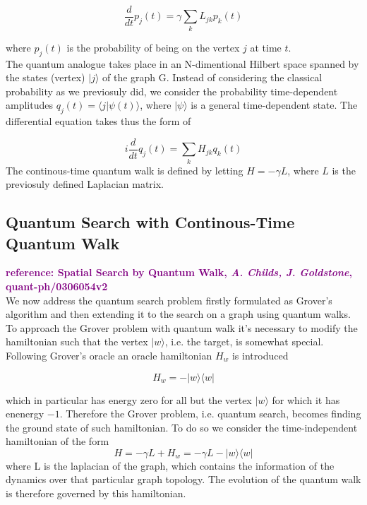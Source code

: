 \documentclass[aps,pra,reprint, onecolumn, showkeys]{revtex4-2}
\newcommand{\purple}[1]{\textcolor{purple}{\textbf{reference: #1}}}
\begin{document}
\begin{equation}
  \frac{d}{dt}p_j(t) = \gamma\sum_{k}L_{jk}p_k(t)
\end{equation}

where $p_j(t)$ is the probability of being on the vertex $j$ at time $t$.\\
The quantum analogue takes place in an N-dimentional Hilbert space spanned by the states (vertex) $|j\rangle$ of the graph G. Instead of considering the classical probability as we previosuly did, we consider the probability time-dependent amplitudes $q_j(t) = \langle j|\psi(t)\rangle$, where $|\psi\rangle$ is a general time-dependent state. The differential equation takes thus the form of

\begin{equation}
  i\frac{d}{dt}q_j(t) = \sum_{k}H_{jk}q_k(t)
\end{equation}
The continous-time quantum walk is defined by letting $H=-\gamma L$, where $L$ is the previosuly defined Laplacian matrix.


\subsection{Quantum Search with Continous-Time Quantum Walk}
\purple{Spatial Search by Quantum Walk, \textit{A. Childs, J. Goldstone}, quant-ph/0306054v2}\\
We now address the quantum search problem firstly formulated as Grover's algorithm and then extending it to the search on a graph using quantum walks. \\
To approach the Grover problem with quantum walk it's necessary to modify the hamiltonian such that the vertex $|w\rangle$, i.e. the target, is somewhat special. Following Grover's oracle an oracle hamiltonian $H_w$ is introduced

\begin{equation}
  H_w = -|w\rangle\langle w|
\end{equation}

which in particular has energy zero for all but the vertex $|w\rangle$ for which it has enenergy $-1$. Therefore the Grover problem, i.e. quantum search, becomes finding the ground state of such hamiltonian. To do so we consider the time-independent hamiltonian of the form
\begin{equation}
  H = -\gamma L + H_w = -\gamma L -|w\rangle\langle w|
\end{equation}
where L is the laplacian of the graph, which contains the information of the dynamics over that particular graph topology. The evolution of the quantum walk is therefore governed by this hamiltonian.\\
\end{document}
